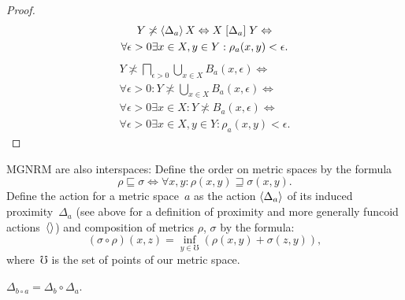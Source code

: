 \begin{proof}
\begin{multline*}
Y\not\asymp\left\langle \Delta_a\right\rangle X\Leftrightarrow X\mathrel{\left[\Delta_a\right]}Y \Leftrightarrow \\ \forall\epsilon>0\exists x\in X,y\in Y:\rho_a(x,y)<\epsilon.
\end{multline*}
\begin{multline*}
Y\nasymp\bigsqcap_{\epsilon>0}\bigcup_{x\in X}B_a(x,\epsilon) \Leftrightarrow \\ \forall\epsilon>0:Y\nasymp\bigcup_{x\in X}B_a(x,\epsilon) \Leftrightarrow \\
\forall\epsilon>0\exists x\in X:Y\nasymp B_a(x,\epsilon) \Leftrightarrow \\
\forall\epsilon>0\exists x\in X,y\in Y:\rho_a(x,y)<\epsilon.
\end{multline*}
\end{proof}

MGNRM are also interspaces: Define the order on metric spaces by the formula \[ \rho\sqsubseteq\sigma \Leftrightarrow \forall x,y:\rho(x,y)\sqsupseteq\sigma(x,y). \] Define the action for a metric space~$a$ as the action $\left\langle \Delta_a\right\rangle$ of its induced proximity~$\Delta_a$ (see above for a definition of proximity and more generally funcoid actions~$\left\langle \right\rangle$) and composition of metrics $\rho$, $\sigma$ by the formula: \[ (\sigma\circ\rho)(x,z) = \inf_{y\in\mho}(\rho(x,y)+\sigma(z,y)), \]
where~$\mho$ is the set of points of our metric space.

\begin{lem}
$\Delta_{b\circ a} = \Delta_b\circ\Delta_a$.
\end{lem}

